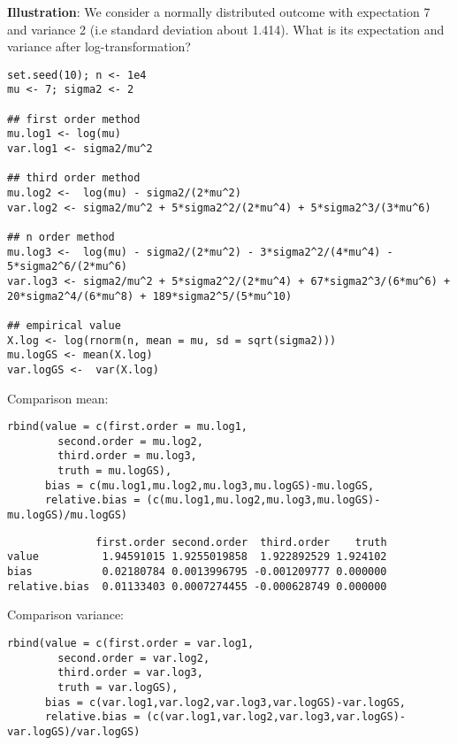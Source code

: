 \documentclass[12pt]{article}
\begin{document}
\textbf{Illustration}: We consider a normally distributed outcome with
expectation 7 and variance 2 (i.e standard deviation about
1.414). What is its expectation and variance after log-transformation?
\lstset{language=r,label= ,caption= ,captionpos=b,numbers=none}
\begin{lstlisting}
set.seed(10); n <- 1e4
mu <- 7; sigma2 <- 2

## first order method
mu.log1 <- log(mu)
var.log1 <- sigma2/mu^2

## third order method
mu.log2 <-  log(mu) - sigma2/(2*mu^2)
var.log2 <- sigma2/mu^2 + 5*sigma2^2/(2*mu^4) + 5*sigma2^3/(3*mu^6)

## n order method
mu.log3 <-  log(mu) - sigma2/(2*mu^2) - 3*sigma2^2/(4*mu^4) - 5*sigma2^6/(2*mu^6)
var.log3 <- sigma2/mu^2 + 5*sigma2^2/(2*mu^4) + 67*sigma2^3/(6*mu^6) + 20*sigma2^4/(6*mu^8) + 189*sigma2^5/(5*mu^10)

## empirical value
X.log <- log(rnorm(n, mean = mu, sd = sqrt(sigma2)))
mu.logGS <- mean(X.log)
var.logGS <-  var(X.log)
\end{lstlisting}

\clearpage

Comparison mean:
\lstset{language=r,label= ,caption= ,captionpos=b,numbers=none}
\begin{lstlisting}
rbind(value = c(first.order = mu.log1, 
		second.order = mu.log2, 
		third.order = mu.log3, 
		truth = mu.logGS),
      bias = c(mu.log1,mu.log2,mu.log3,mu.logGS)-mu.logGS,
      relative.bias = (c(mu.log1,mu.log2,mu.log3,mu.logGS)-mu.logGS)/mu.logGS)
\end{lstlisting}

\begin{verbatim}
              first.order second.order  third.order    truth
value          1.94591015 1.9255019858  1.922892529 1.924102
bias           0.02180784 0.0013996795 -0.001209777 0.000000
relative.bias  0.01133403 0.0007274455 -0.000628749 0.000000
\end{verbatim}

Comparison variance:
\lstset{language=r,label= ,caption= ,captionpos=b,numbers=none}
\begin{lstlisting}
rbind(value = c(first.order = var.log1, 
		second.order = var.log2, 
		third.order = var.log3, 
		truth = var.logGS),
      bias = c(var.log1,var.log2,var.log3,var.logGS)-var.logGS,
      relative.bias = (c(var.log1,var.log2,var.log3,var.logGS)-var.logGS)/var.logGS)
\end{lstlisting}
\end{document}
